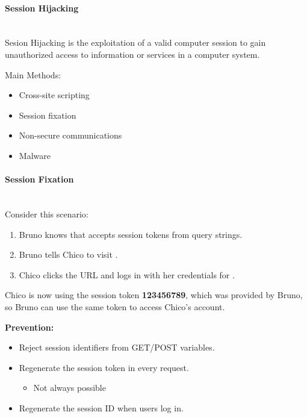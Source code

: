 \documentclass[../ESOF_notes.tex]{subfiles}
\begin{document}
\paragraph{Session Hijacking} \mbox{}\\

Sesion Hijacking is the exploitation of a valid computer session to gain unauthorized access to information or services in a computer system.

Main Methods:
\begin{itemize}
    \item Cross-site scripting
    \item Session fixation
    \item Non-secure communications
    \item Malware
\end{itemize}

\paragraph{Session Fixation} \mbox{}\\

Consider this scenario:
\begin{enumerate}
    \item Bruno knows that  accepts session tokens from query strings.
    \item Bruno tells Chico to visit .
    \item Chico clicks the URL and logs in with her credentials for .
\end{enumerate}

Chico is now using the session token \textbf{123456789}, which was provided by Bruno, so Bruno can use the same token to access Chico's account.
\newline

\quad \textbf{Prevention:}
\begin{itemize}
    \item Reject session identifiers from GET/POST variables.
    \item Regenerate the session token in every request.
    \begin{itemize}
        \item Not always possible
    \end{itemize}
    \item Regenerate the session ID when users log in.
\end{itemize}
\end{document}
